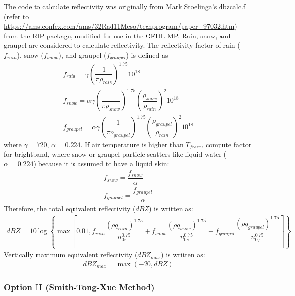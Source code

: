 \documentclass[letterpaper,titlepage,10pt]{article}
\numberwithin{equation}{section}
\begin{document}
The code to calculate reflectivity was originally from Mark Stoelinga's dbzcalc.f (refer to \url{https://ams.confex.com/ams/32Rad11Meso/techprogram/paper_97032.htm}) from the RIP package, modified for use in the GFDL MP. Rain, snow, and graupel are considered to calculate reflectivity. The reflectivity factor of rain ($f_{rain}$), snow ($f_{snow}$), and graupel ($f_{graupel}$) is defined as
\begin{gather}
	f_{rain} = \gamma \left(\dfrac{1}{\pi \rho_{rain}} \right)^{1.75} 10^{18} \\
	f_{snow} = \alpha \gamma \left(\dfrac{1}{\pi \rho_{snow}} \right)^{1.75} \left(\dfrac{\rho_{snow}}{\rho_{rain}} \right)^2 10^{18} \\
	f_{graupel} = \alpha \gamma \left(\dfrac{1}{\pi \rho_{graupel}} \right)^{1.75} \left(\dfrac{\rho_{graupel}}{\rho_{rain}} \right)^2 10^{18}
\end{gather}
where $\gamma = 720$, $\alpha = 0.224$. If air temperature is higher than $T_{freez}$, compute factor for brightband, where snow or graupel particle scatters like liquid water ($\alpha = 0.224$) because it is assumed to have a liquid skin:
\begin{gather}
	f_{snow} = \dfrac{f_{snow}}{\alpha} \\
	f_{graupel} = \dfrac{f_{graupel}}{\alpha}
\end{gather}
Therefore, the total equivalent reflectivity ($dBZ$) is written as:
\begin{gather}
	dBZ = 10 \log \left\{\max \left[0.01, f_{rain} \dfrac{\left(\rho q_{rain} \right)^{1.75}}{n_{0r}^{0.75}} + f_{snow} \dfrac{\left(\rho q_{snow} \right)^{1.75}}{n_{0s}^{0.75}} + f_{graupel} \dfrac{\left(\rho q_{graupel} \right)^{1.75}}{n_{0g}^{0.75}} \right] \right\}
\end{gather}
Vertically maximum equivalent reflectivity ($dBZ_{max}$) is written as:
\begin{gather}
	dBZ_{max} = \max \left(-20, dBZ \right)
\end{gather}


\subsubsection*{Option II (Smith-Tong-Xue Method)}
\end{document}
